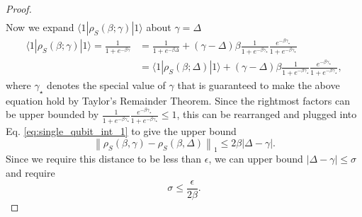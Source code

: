 \documentclass[
 amsmath,amssymb,
 aps,
onecolumn, 
nofootinbib]{revtex4-2}
\newcommand{\ket}[1]{|#1\rangle}
\newcommand{\bra}[1]{\langle #1|}
\newcommand{\norm}[1]{\left\| #1 \right\|}
\begin{document}
\begin{proof}
\begin{align}
 \end{align}
    Now we expand $\bra{1} \rho_S(\beta; \gamma) \ket{1}$ about $\gamma = \Delta$
    \begin{align}
    \bra{1} \rho_S(\beta; \gamma) \ket{1} = \frac{1}{1 + e^{-\beta \gamma}} &= \frac{1}{1 + e^{-\beta \Delta}} + (\gamma - \Delta) \beta \frac{1}{1 + e^{-\beta \gamma_{\star}}} \frac{e^{-\beta \gamma_{\star}}}{1 + e^{-\beta \gamma_{\star}}} \\
    &= \bra{1} \rho_S(\beta; \Delta) \ket{1} + (\gamma - \Delta) \beta \frac{1}{1 + e^{-\beta \gamma_{\star}}} \frac{e^{-\beta \gamma_{\star}}}{1 + e^{-\beta \gamma_{\star}}},
    \end{align}
    where $\gamma_{\star}$ denotes the special value of $\gamma$ that is guaranteed to make the above equation hold by Taylor's Remainder Theorem.
    Since the rightmost factors can be upper bounded by $\frac{1}{1 + e^{-\beta \gamma_{\star}}} \frac{e^{-\beta \gamma_{\star}}}{1 + e^{-\beta \gamma_{\star}}} \le 1$, this can be rearranged and plugged into Eq. \eqref{eq:single_qubit_int_1} to give the upper bound
 \begin{equation}
 \norm{\rho_S(\beta, \gamma) - \rho_S(\beta, \Delta)}_1 \le 2 \beta |\Delta - \gamma|.
 \end{equation}
Since we require this distance to be less than $\epsilon$, we can upper bound $|\Delta - \gamma| \le \sigma$ and require
\begin{equation}
    \sigma \le \frac{\epsilon}{2 \beta}. \label{eq:single_qubit_ineq_1}
\end{equation}


\end{proof}
\end{document}
